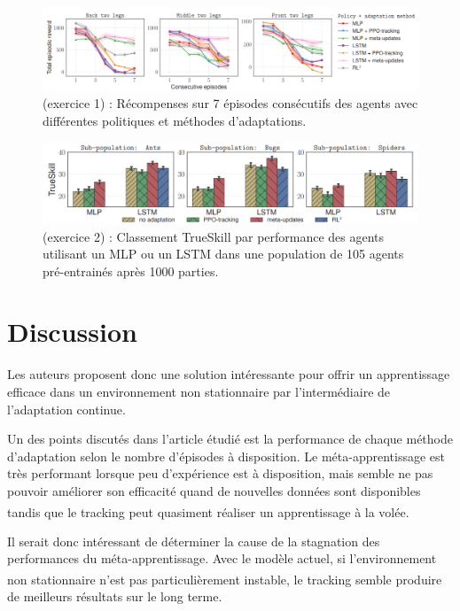 \documentclass[a4paper,11pt]{article}
\begin{document}
    \begin{figure}[h]
      \centering
      \includegraphics[width=\textwidth]{fig2.png}
      \caption{(exercice 1) : Récompenses sur 7 épisodes consécutifs des agents avec différentes politiques et méthodes d'adaptations.}
      \label{ex1}
    \end{figure}

    \begin{figure}[h]
      \centering
      \includegraphics[width=\textwidth]{fig3.png}
      \caption{(exercice 2) : Classement TrueSkill par performance des agents utilisant un MLP ou un LSTM dans une population de 105 agents pré-entrainés après 1000 parties.}
      \label{ex2}
    \end{figure}

    \section{Discussion}

    Les auteurs proposent donc une solution intéressante pour offrir un apprentissage efficace 
    dans un environnement non stationnaire par l'intermédiaire de l'adaptation continue.

    Un des points discutés dans l'article étudié est la performance de chaque méthode d'adaptation 
    selon le nombre d'épisodes à disposition. Le méta-apprentissage est très performant lorsque peu 
    d'expérience est à disposition, mais semble ne pas pouvoir améliorer son efficacité quand de nouvelles 
    données sont disponibles tandis que le tracking peut quasiment réaliser un apprentissage à la volée\textsuperscript{\cite{paper}}.
    
    Il serait donc intéressant de déterminer la cause de la stagnation des performances du méta-apprentissage.
    Avec le modèle actuel, si l'environnement non stationnaire n'est pas particulièrement instable, 
    le tracking\textsuperscript{\cite{sutton}} semble produire de meilleurs résultats sur le long terme.
\end{document}
